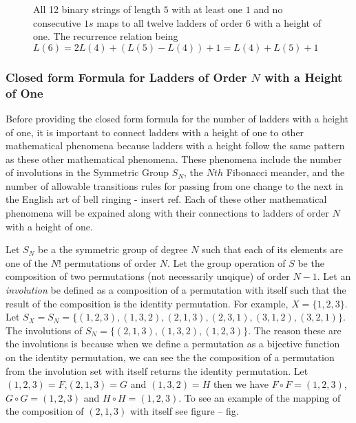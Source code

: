 \begin{center}
\begin{figure}[!htp]
\begin{minipage}{.4\textwidth}
    \end{minipage}

    \caption{All 12 binary strings of length $5$ with at least one $1$ and no consecutive $1s$ maps to all twelve ladders of order $6$ with a height of one. 
    The recurrence relation being $L(6)=2L(4)+(L(5)-L(4))+1=L(4)+L(5)+1$}
\end{figure}
\end{center}

\subsubsection{Closed form Formula for Ladders of Order $N$ with a Height of One}
Before providing the closed form formula for the number of ladders with a height of one, it is important to connect ladders with a height of one to other 
mathematical phenomena because ladders with a height follow the same pattern as these other mathematical phenomena. These phenomena include 
the number of involutions in the Symmetric Group $S_{N}$, the $Nth$ Fibonacci meander, and the number of allowable transitions rules for passing from 
one change to the next in the English art of bell ringing - insert ref. Each of these other mathematical phenomena will be expained along with their 
connections to ladders of order $N$ with a height of one.\par 

Let $S_{N}$ be a the symmetric group of degree $N$ such that each of its elements are one of the $N!$ permutations of order $N$. Let the group 
operation of $S$ be the composition of two permutations (not necessarily unqique) of order $N-1$. Let an \emph{involution} 
be defined as a composition of a permutation with itself such that the result of the composition is the identity permutation. 
For example, $X=\{1, 2, 3\}$. Let $S_{X} = S_{N} = \{(1,2,3),(1,3,2),(2,1,3),(2,3,1),(3,1,2),(3,2,1)\}$. The involutions of $S_{N}=\{(2,1,3),(1,3,2),(1,2,3)\}$.
The reason these are the involutions is because when we define a permutation as a bijective function on the identity permutation, we can see the the composition 
of a permutation from the involution set with itself returns the identity permutation. Let $(1,2,3)=F$,$(2,1,3)=G$ and $(1,3,2)=H$ then we have $F \circ F=(1,2,3)$,
$G \circ G = (1,2,3)$ and $H \circ H=(1,2,3)$. To see an example of the mapping of the composition of $(2,1,3)$ with itself see figure -- fig.\pagebreak  



